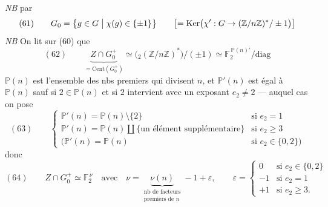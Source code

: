 \documentclass[11pt,a4paper]{article}
\begin{document}
\emph{NB} \struck{\ill{}} \add{\ill{}} par
\[
(61) \qquad G_0 = \bigl\{ g \in G \bigm| \chi(g) \in \{\pm 1\} \bigr\} \qquad \bigl[ = \mathrm{Ker}\bigl(\chi' : G \to (\mathbb{Z}/n\mathbb{Z})^{*}/\pm 1\bigr) \bigr]
\]
\emph{NB} On lit sur (60) que
\[
(62) \qquad \underbrace{Z \cap G_0^{+}}_{= \mathrm{Cent}(G_0^{+})} \simeq \bigl({}_2(\mathbb{Z}/n\mathbb{Z})^{*}\bigr)/(\pm 1) \simeq \mathbb{F}_2^{\,\mathbb{P}(n)'}/\mathrm{diag}
\]
$\mathbb{P}(n)$ est l'ensemble des nbs premiers  qui divisent $n$, et $\mathbb{P}'(n)$ est égal à $\mathbb{P}(n)$ sauf si $2 \in \mathbb{P}(n)$ et si $2$ intervient  avec un \struck{\ill{}} exposant $e_2 \neq 2$ — auquel cas on pose
\[
(63) \qquad \begin{cases} \mathbb{P}'(n) = \mathbb{P}(n) \setminus \{2\} & \text{si } e_2 = 1 \\ \mathbb{P}'(n) = \mathbb{P}(n) \amalg \{\text{un élément supplémentaire}\} & \text{si } e_2 \geqslant 3 \\ (\mathbb{P}'(n) = \mathbb{P}(n) & \text{si } e_2 \in \{0, 2\}) \end{cases}
\]
donc
\[
(64) \qquad Z \cap G_0^{+} \simeq \mathbb{F}_2^{\,\nu} \quad \text{avec} \quad \nu = \underbrace{\nu(n)}_{\substack{\text{nb de facteurs} \\ \text{premiers de } n}} - 1 + \varepsilon, \qquad \varepsilon = \begin{cases} 0 & \text{si } e_2 \in \{0, 2\} \\ -1 & \text{si } e_2 = 1 \\ +1 & \text{si } e_2 \geqslant 3 . \end{cases}
\]
\end{document}
